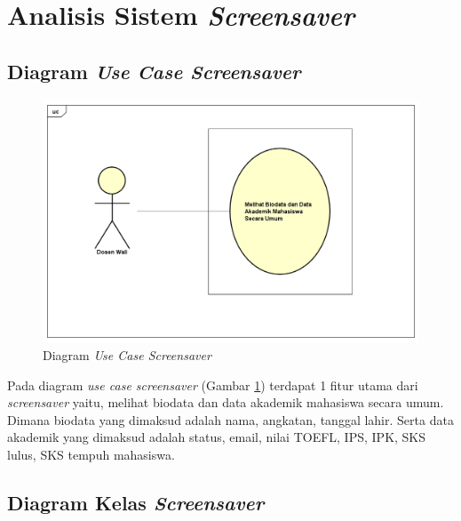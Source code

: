 \section{Analisis Sistem \textit{Screensaver}}

\subsection{Diagram \textit{Use Case Screensaver}}

\begin{figure}[H]
	\centering
	\includegraphics[scale=0.45]{Gambar/UseCase.png}
	\caption{Diagram \textit{Use Case Screensaver}}
	\label{fig:3_usecase_diagram}
\end{figure}
    
Pada diagram \textit{use case screensaver} (Gambar \ref{fig:3_usecase_diagram}) terdapat 1 fitur utama
dari \textit{screensaver} yaitu, melihat biodata dan data akademik mahasiswa secara umum. Dimana biodata yang dimaksud adalah nama, angkatan, tanggal lahir. Serta data akademik yang dimaksud adalah status, email, nilai TOEFL, IPS, IPK, SKS lulus, SKS tempuh mahasiswa.


\subsection{Diagram Kelas \textit{Screensaver}}




